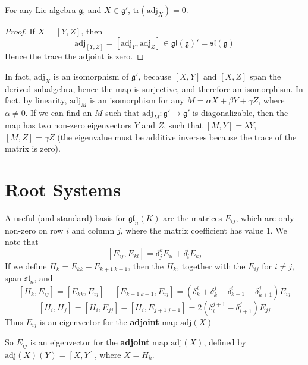 \begin{lemma}
    For any Lie algebra $\mathfrak{g}$, and $X \in \mathfrak{g}'$, $\text{tr}(\text{adj}_X) = 0$.
\end{lemma}
\begin{proof}
    If $X = [Y,Z]$, then
    \[ \text{adj}_{[Y,Z]} = [\text{adj}_Y, \text{adj}_Z] \in \mathfrak{gl}(\mathfrak{g})' = \mathfrak{sl}(\mathfrak{g}) \]
    Hence the trace the adjoint is zero.
\end{proof}

In fact, $\text{adj}_X$ is an isomorphism of $\mathfrak{g}'$, because $[X,Y]$ and $[X,Z]$ span the derived subalgebra, hence the map is surjective, and therefore an isomorphism. In fact, by linearity, $\text{adj}_M$ is an isomorphism for any $M = \alpha X + \beta Y + \gamma Z$, where $\alpha \neq 0$. If we can find an $M$ such that $\text{adj}_M: \mathfrak{g}' \to \mathfrak{g}'$ is diagonalizable, then the map has two non-zero eigenvectors $Y$ and $Z$, such that $[M,Y] = \lambda Y$, $[M,Z] = \gamma Z$ (the eigenvalue must be additive inverses because the trace of the matrix is zero).




\section{Root Systems}

A useful (and standard) basis for $\mathfrak{gl}_n(K)$ are the matrices $E_{ij}$, which are only non-zero on row $i$ and column $j$, where the matrix coefficient has value 1. We note that
%
\[ [E_{ij}, E_{kl}] = \delta_j^k E_{il} + \delta_i^l E_{kj} \]
%
If we define $H_k = E_{kk} - E_{k+1\ k+1}$, then the $H_k$, together with the $E_{ij}$ for $i \neq j$, span $\mathfrak{sl}_n$, and
%
\[ [H_k, E_{ij}] = [E_{kk}, E_{ij}] - [E_{k+1\ k+1}, E_{ij}] = (\delta_k^i + \delta_k^j - \delta_{k+1}^i - \delta_{k+1}^j) E_{ij} \]
%
\[ [H_i, H_j] = [H_i, E_{jj}] - [H_i, E_{j+1\ j+1}] = 2(\delta_i^{j+1} - \delta_{i+1}^j) E_{jj} \]
%
Thus $E_{ij}$ is an eigenvector for the {\bf adjoint} map $\text{adj}(X)$

So $E_{ij}$ is an eigenvector for the {\bf adjoint} map $\text{adj}(X)$, defined by $\text{adj}(X)(Y) = [X,Y]$, where $X = H_k$.

